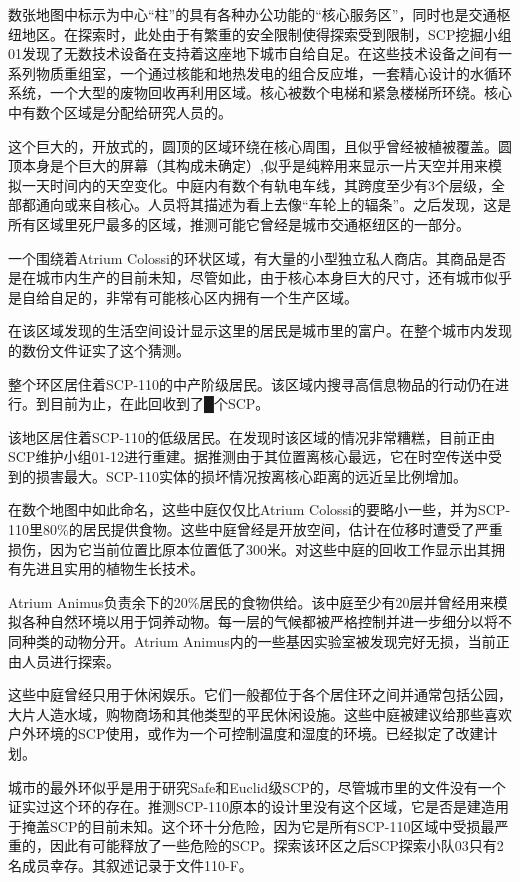 数张地图中标示为中心“柱”的具有各种办公功能的“核心服务区”，同时也是交通枢纽地区。在探索时，此处由于有繁重的安全限制使得探索受到限制，SCP挖掘小组01发现了无数技术设备在支持着这座地下城市自给自足。在这些技术设备之间有一系列物质重组室，一个通过核能和地热发电的组合反应堆，一套精心设计的水循环系统，一个大型的废物回收再利用区域。核心被数个电梯和紧急楼梯所环绕。核心中有数个区域是分配给研究人员的。

这个巨大的，开放式的，圆顶的区域环绕在核心周围，且似乎曾经被植被覆盖。圆顶本身是个巨大的屏幕（其构成未确定）,似乎是纯粹用来显示一片天空并用来模拟一天时间内的天空变化。中庭内有数个有轨电车线，其跨度至少有3个层级，全部都通向或来自核心。人员将其描述为看上去像“车轮上的辐条”。之后发现，这是所有区域里死尸最多的区域，推测可能它曾经是城市交通枢纽区的一部分。

一个围绕着Atrium Colossi的环状区域，有大量的小型独立私人商店。其商品是否是在城市内生产的目前未知，尽管如此，由于核心本身巨大的尺寸，还有城市似乎是自给自足的，非常有可能核心区内拥有一个生产区域。

在该区域发现的生活空间设计显示这里的居民是城市里的富户。在整个城市内发现的数份文件证实了这个猜测。

整个环区居住着SCP-110的中产阶级居民。该区域内搜寻高信息物品的行动仍在进行。到目前为止，在此回收到了█个SCP。

该地区居住着SCP-110的低级居民。在发现时该区域的情况非常糟糕，目前正由SCP维护小组01-12进行重建。据推测由于其位置离核心最远，它在时空传送中受到的损害最大。SCP-110实体的损坏情况按离核心距离的远近呈比例增加。

在数个地图中如此命名，这些中庭仅仅比Atrium Colossi的要略小一些，并为SCP-110里80\%的居民提供食物。这些中庭曾经是开放空间，估计在位移时遭受了严重损伤，因为它当前位置比原本位置低了300米。对这些中庭的回收工作显示出其拥有先进且实用的植物生长技术。

Atrium Animus负责余下的20\%居民的食物供给。该中庭至少有20层并曾经用来模拟各种自然环境以用于饲养动物。每一层的气候都被严格控制并进一步细分以将不同种类的动物分开。Atrium Animus内的一些基因实验室被发现完好无损，当前正由人员进行探索。

这些中庭曾经只用于休闲娱乐。它们一般都位于各个居住环之间并通常包括公园，大片人造水域，购物商场和其他类型的平民休闲设施。这些中庭被建议给那些喜欢户外环境的SCP使用，或作为一个可控制温度和湿度的环境。已经拟定了改建计划。

城市的最外环似乎是用于研究Safe和Euclid级SCP的，尽管城市里的文件没有一个证实过这个环的存在。推测SCP-110原本的设计里没有这个区域，它是否是建造用于掩盖SCP的目前未知。这个环十分危险，因为它是所有SCP-110区域中受损最严重的，因此有可能释放了一些危险的SCP。探索该环区之后SCP探索小队03只有2名成员幸存。其叙述记录于文件110-F。

